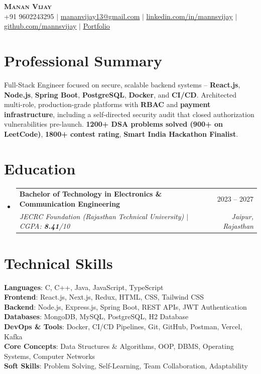 \documentclass[letterpaper,11pt]{article}
\makeatletter
\newcommand{\resumeSubheading}[4]{
  \vspace{-2pt}\item
    \begin{tabular*}{0.97\textwidth}[t]{l@{\extracolsep{\fill}}r}
      \textbf{#1} & #2 \\
      \textit{\small#3} & \textit{\small #4} \\
    \end{tabular*}\vspace{-9pt}
}
\newcommand{\resumeSubHeadingListStart}{\begin{itemize}[leftmargin=0.15in, label={}]}
\newcommand{\resumeSubHeadingListEnd}{\end{itemize}}
\makeatother
\begin{document}
\begin{center}
    \textbf{\Huge \scshape Manan Vijay} \\ \vspace{3pt}
    \small
    +91 9602243295 $|$
    \href{mailto:mananvijay13@gmail.com}{\underline{mananvijay13@gmail.com}} $|$
    \href{https://www.linkedin.com/in/mannsvijay/}{\underline{linkedin.com/in/mannsvijay}} $|$
    \href{https://github.com/mannsvijay}{\underline{github.com/mannsvijay}} $|$
    \href{https://portfolio-mannsvijays-projects.vercel.app/}{\underline{Portfolio}}
\end{center}

\section{Professional Summary}
\small{
Full-Stack Engineer focused on secure, scalable backend systems -- \textbf{React.js}, \textbf{Node.js}, \textbf{Spring Boot}, \textbf{PostgreSQL}, \textbf{Docker}, and \textbf{CI/CD}. Architected multi-role, production-grade platforms with \textbf{RBAC} and \textbf{payment infrastructure}, including a self-directed security audit that closed authorization vulnerabilities pre-launch. \textbf{1200+ DSA problems solved (900+ on LeetCode)}, \textbf{1800+ contest rating}, \textbf{Smart India Hackathon Finalist}.
}
\section{Education}
  \resumeSubHeadingListStart
    \resumeSubheading
      {Bachelor of Technology in Electronics \& Communication Engineering}{2023 -- 2027}
      {JECRC Foundation (Rajasthan Technical University) $|$ CGPA: \textbf{8.41}/10}{Jaipur, Rajasthan}
  \resumeSubHeadingListEnd



  \section{Technical Skills}
 \begin{itemize}[leftmargin=0.15in, label={}]
    \small{\item{
     \textbf{Languages}{: C, C++, Java, JavaScript, TypeScript} \\
     \textbf{Frontend}{: React.js, Next.js, Redux, HTML, CSS, Tailwind CSS} \\
     \textbf{Backend}{: Node.js, Express.js, Spring Boot, REST APIs, JWT Authentication} \\
     \textbf{Databases}{: MongoDB, MySQL, PostgreSQL, H2 Database} \\
     \textbf{DevOps \& Tools}{: Docker, CI/CD Pipelines, Git, GitHub, Postman, Vercel, Kafka} \\
     \textbf{Core Concepts}{: Data Structures \& Algorithms, OOP, DBMS, Operating Systems, Computer Networks} \\
     \textbf{Soft Skills}{: Problem Solving, Self-Learning, Team Collaboration, Adaptability} \\
    }}
 \end{itemize}
\end{document}
